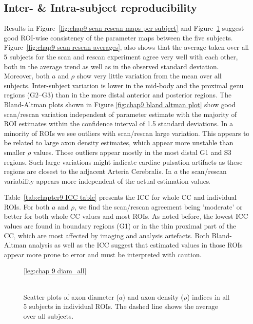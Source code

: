 \subsection{Inter- \& Intra-subject reproducibility}
Results in Figure~\ref{fig:chap9 scan rescan maps per subject} and  Figure~\ref{fig:chap9 scan rescan scatterplots per subject} suggest good ROI-wise consistency of the parameter maps between the five subjects. Figure~\ref{fig:chap9 scan rescan averages}, also shows that the average taken over all 5 subjects for the scan and rescan experiment agree very well with each other, both in the average trend as well as in the observed standard deviation. Moreover, both $a$ and $\rho$ show very little variation from the mean over all subjects. Inter-subject variation is lower in the mid-body and the proximal genu regions (G2--G3) than in the more distal anterior and posterior regions. The Bland-Altman plots shown in Figure \ref{fig:chap9 bland altman plot} show good scan/rescan variation independent of parameter estimate with the majority of ROI estimates within the confidence interval of 1.5 standard deviations. In a minority of ROIs we see outliers with scan/rescan large variation. This appears to be related to large axon density estimates, which appear more unstable than smaller $\rho$ values. Those outliers appear mostly in the most distal G1 and S3 regions. Such large variations might indicate cardiac pulsation artifacts as these regions are closest to the adjacent Arteria Cerebralis. In $a$ the scan/rescan variability appears more independent of the actual estimation values.


Table~\ref{tab:chapter9 ICC table} presents the \gls{ICC} for whole CC and individual ROIs. For both $a$ and $\rho$, we find the scan/rescan agreement being 'moderate' or better for both whole CC values and most ROIs. As noted before, the lowest ICC values are found in boundary regions (G1) or in the thin proximal part of the CC, which are most affected by imaging and analysis artefacts. Both Bland-Altman analysis as well as the ICC suggest that estimated values in those ROIs appear more prone to error and must be interpreted with caution.

\begin{figure}[ht]
	\centering
	\ref{leg:chap 9 diam_all}
	\\	
	\\
	\caption{Scatter plots of axon diameter ($a$) and axon density ($\rho$) indices in all 5 subjects in individual ROIs. The dashed line shows the average over all subjects.}
	\label{fig:chap9 scan rescan scatterplots per subject}
\end{figure}

